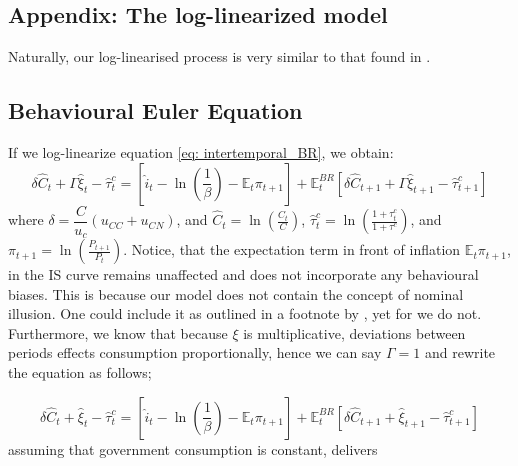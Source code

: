 \documentclass[11pt]{article}
\begin{document}
\begin{spacing}{2}
	



\pagebreak
\printbibliography


\pagebreak
\section{Appendix: The log-linearized model}
Naturally, our log-linearised process is very similar to that found in \cite{correia2013unconventional}.

\subsection{Behavioural Euler Equation}
If we log-linearize equation \ref{eq: intertemporal_BR}, we obtain:
\begin{equation}
	\delta \hat{C}_t + \Gamma \hat{\xi}_t - \hat{\tau}^c_t =  \left[\hat{i}_t - \ln\left(\frac{1}{\beta}\right) - \mathbb{E}_t \pi_{t+1}\right] + \mathbb{E}_t^{BR} \left[\delta \hat{C}_{t+1} + \Gamma\hat{\xi}_{t+1} - \hat{\tau}^c_{t+1}\right]
\end{equation}
where $\delta = \dfrac{C }{u_c}(u_{CC }+ u_{CN })$, and $\hat{C}_t = \ln\left(\frac{C_t}{C}\right)$,  $\hat{\tau}^c_t = \ln\left(\frac{1+\tau^c_t}{1+\tau^c}\right)$, and $\pi_{t+1} = \ln\left(\frac{P_{t+1}}{P_t}\right)$.  Notice, that  the expectation term in front of inflation $\mathbb{E}_t \pi_{t+1}$, in the IS curve remains unaffected and does not incorporate any behavioural biases. This is because our model does not contain the concept of nominal illusion. One could include it as outlined in a footnote by \cite{gabaix2020behavioural}, yet for   we do not. 
Furthermore,  we know that because $\xi$ is multiplicative, deviations between periods effects consumption proportionally, hence we can say $\Gamma = 1$ and rewrite the equation as follows;

\begin{equation}
	\delta \hat{C}_t +  \hat{\xi}_t - \hat{\tau}^c_t =  \left[\hat{i}_t - \ln\left(\frac{1}{\beta}\right) - \mathbb{E}_t \pi_{t+1}\right] + \mathbb{E}_t^{BR} \left[\delta \hat{C}_{t+1} + \hat{\xi}_{t+1} - \hat{\tau}^c_{t+1}\right]
\end{equation}
assuming that government consumption is constant, delivers



\end{spacing}
\end{document}
